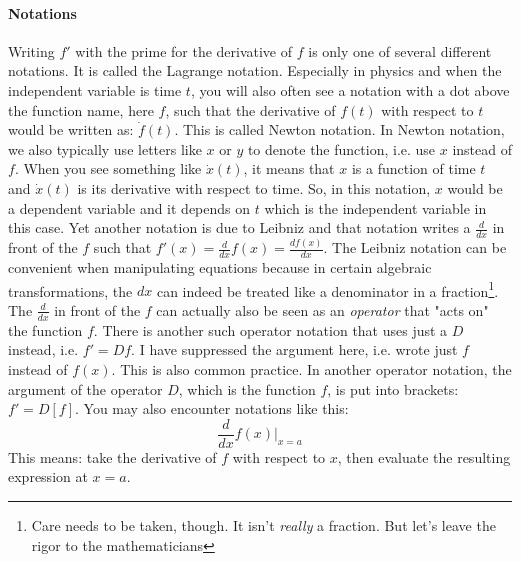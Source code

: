 \paragraph{Notations} Writing $f'$ with the prime for the derivative of $f$ is only one of several different notations. It is called the Lagrange notation. Especially in physics and when the independent variable is time $t$, you will also often see a notation with a dot above the function name, here $f$, such that the derivative of $f(t)$ with respect to $t$ would be written as: $\dot{f}(t)$. This is called Newton notation. In Newton notation, we also typically use letters like $x$ or $y$ to denote the function, i.e. use $x$ instead of $f$. When you see something like $\dot{x}(t)$, it means that $x$ is a function of time $t$ and $\dot{x}(t)$ is its derivative with respect to time. So, in this notation, $x$ would be a dependent variable and it depends on $t$ which is the independent variable in this case. Yet another notation is due to Leibniz and that notation writes a $\frac{d}{dx}$ in front of the $f$ such that $f'(x) = \frac{d}{dx} f(x) = \frac{d f(x)}{dx}$. The Leibniz notation can be convenient when manipulating equations because in certain algebraic transformations, the $dx$ can indeed be treated like a denominator in a fraction\footnote{Care needs to be taken, though. It isn't \emph{really} a fraction. But let's leave the rigor to the mathematicians}. The $\frac{d}{dx}$ in front of the $f$ can actually also be seen as an \emph{operator} that "acts on" the function $f$. There is another such operator notation that uses just a $D$ instead, i.e. $f' = D f$. I have suppressed the argument here, i.e. wrote just $f$ instead of $f(x)$. This is also common practice. In another operator notation, the argument of the operator $D$, which is the function $f$, is put into brackets: $f' = D[f]$. You may also encounter notations like this:
\begin{equation}
	\frac{d}{d x} f(x) \bigg\rvert_{x=a}
\end{equation}
This means: take the derivative of $f$ with respect to $x$, then evaluate the resulting expression at $x = a$.



